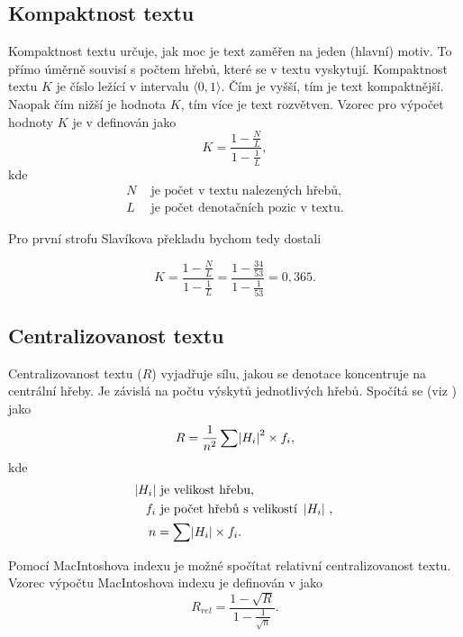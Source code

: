 \documentclass[dp.tex]{subfiles}
\begin{document}
\subsection{Kompaktnost textu}
Kompaktnost textu určuje, jak moc je text zaměřen na jeden (hlavní) motiv. To přímo úměrně souvisí s počtem hřebů, které se v textu vyskytují. Kompaktnost textu $K$ je číslo ležící v intervalu $\langle0, 1\rangle$. Čím je vyšší, tím je text kompaktnější. Naopak čím nižší je hodnota $K$, tím více je text rozvětven. Vzorec pro výpočet hodnoty $K$ je v \cite[str. 303]{Wimmer2003} definován jako
\begin{equation}
K=\frac{1-\frac{N}{L}}{1-\frac{1}{L}},
\end{equation}
kde 
\begin{align*}
      N & \text{ je počet v textu nalezených hřebů,}\\
      L & \text{ je počet denotačních pozic v textu.}
\end{align*}     

Pro první strofu Slavíkova překladu bychom tedy dostali

\begin{equation}
K=\frac{1-\frac{N}{L}}{1-\frac{1}{L}} = \frac{1-\frac{34}{53}}{1-\frac{1}{53}}=0,365.
\end{equation}

\subsection{Centralizovanost textu}
Centralizovanost textu ($R$) vyjadřuje sílu, jakou se denotace koncentruje na centrální hřeby. Je závislá na počtu výskytů jednotlivých hřebů. Spočítá se (viz \cite[str. 303]{Wimmer2003}) jako
\begin{equation}
R=\frac{1}{n^2}\sum{ \abs{H_i}^2 \times f_i},
\end{equation}
kde 
\begin{align*}
      \abs{H_i} & \text{ je velikost hřebu,}\\
      f_i & \text{ je počet hřebů s velikostí \abs{H_i},}\\
      n&=\sum{ \abs{H_i}\times f_i }.
\end{align*}     

Pomocí MacIntoshova indexu je možné spočítat relativní centralizovanost textu. Vzorec výpočtu MacIntoshova indexu je definován v \cite[str. 304]{Wimmer2003} jako
\begin{equation}
R_{rel}=\frac{1-\sqrt{R}}{1-\frac{1}{\sqrt{n}}}.
\end{equation}
\end{document}
